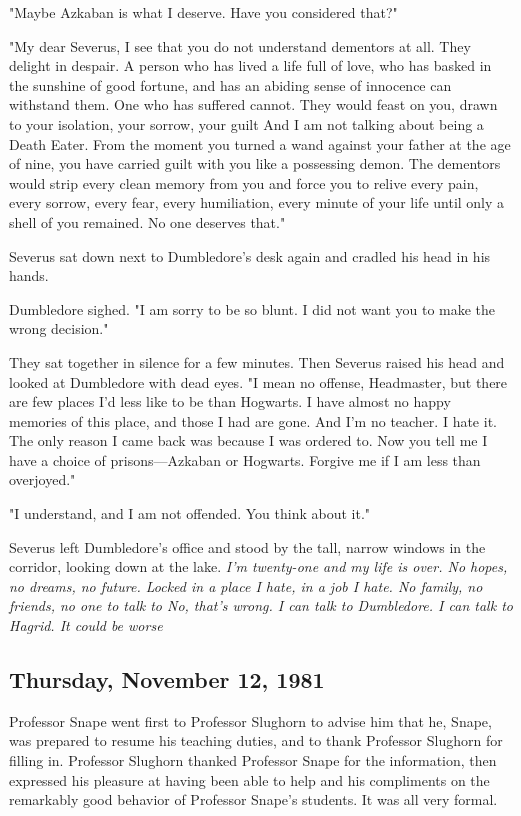 "Maybe Azkaban is what I deserve. Have you considered that?"

"My dear Severus, I see that you do not understand dementors at all. They delight in despair. A person who has lived a life full of love, who has basked in the sunshine of good fortune, and has an abiding sense of innocence can withstand them. One who has suffered cannot. They would feast on you, drawn to your isolation, your sorrow, your guilt{\el} And I am not talking about being a Death Eater. From the moment you turned a wand against your father at the age of nine, you have carried guilt with you like a possessing demon. The dementors would strip every clean memory from you and force you to relive every pain, every sorrow, every fear, every humiliation, every minute of your life until only a shell of you remained. No one deserves that."

Severus sat down next to Dumbledore's desk again and cradled his head in his hands.

Dumbledore sighed. "I am sorry to be so blunt. I did not want you to make the wrong decision."

They sat together in silence for a few minutes. Then Severus raised his head and looked at Dumbledore with dead eyes. "I mean no offense, Headmaster, but there are few places I'd less like to be than Hogwarts. I have almost no happy memories of this place, and those I had are{\el} gone. And I'm no teacher. I hate it. The only reason I came back was because I was ordered to. Now you tell me I have a choice of prisons—Azkaban or Hogwarts. Forgive me if I am less than overjoyed."

"I understand, and I am not offended. You think about it."

Severus left Dumbledore's office and stood by the tall, narrow windows in the corridor, looking down at the lake. \emph{I'm twenty-one and my life is over. No hopes, no dreams, no future. Locked in a place I hate, in a job I hate. No family, no friends, no one to talk to{\el} No, that's wrong. I can talk to Dumbledore. I can talk to Hagrid. It could be worse{\el}}

\subsection{Thursday, November 12, 1981}

Professor Snape went first to Professor Slughorn to advise him that he, Snape, was prepared to resume his teaching duties, and to thank Professor Slughorn for filling in. Professor Slughorn thanked Professor Snape for the information, then expressed his pleasure at having been able to help and his compliments on the remarkably good behavior of Professor Snape's students. It was all very formal.

